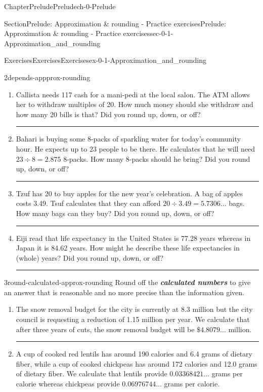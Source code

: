 \documentclass[twoside,11pt,]{book}
\newcommand{\alert}[1]{\textbf{\textit{#1}}}
\newlength{\workspacestrutwidth}
\numberwithin{equation}{section}
\begin{document}
\begin{chapterptx}{Chapter}{Prelude}{}{Prelude}{}{}{ch-0-Prelude}
\begin{sectionptx}{Section}{Prelude: Approximation \& rounding - Practice exercises}{}{Prelude: Approximation \& rounding - Practice exercises}{}{}{sec-0-1-Approximation_and_rounding}
\begin{exercises-subsection-numberless}{Exercises}{Exercises}{}{Exercises}{}{}{ex-0-1-Approximation_and_rounding}
\begin{divisionexercise}{2}{}{}{depends-appprox-rounding}
\begin{enumerate}[label=(\alph*),ref=\alph*]%
\item{}Callista needs \textdollar{}117 cash for a mani-pedi at the local salon. The ATM allows her to withdraw multiples of \textdollar{}20. How much money should she withdraw and how many \textdollar{}20 bills is that? Did you round up, down, or off?%
\par\rule{\workspacestrutwidth}{1.25in}%
\item{}Bahari is buying some 8-packs of sparkling water for today's community hour. He expects up to 23 people to be there. He calculates that he will need \(23 \div 8 = 2.875\) 8-packs. How many 8-packs should he bring? Did you round up, down, or off?%
\par\rule{\workspacestrutwidth}{1.25in}%
\item{}Tzuf has \textdollar{}20 to buy apples for the new year's celebration. A bag of apples costs \textdollar{}3.49. Tsuf calculates that they can afford \(20 \div 3.49 = 5.7306\ldots\) bags. How many bags can they buy? Did you round up, down, or off?%
\par\rule{\workspacestrutwidth}{1.25in}%
\item{}Eiji read that life expectancy in the United States is 77.28 years whereas in Japan it is 84.62 years. How might he describe these life expectancies in (whole) years? Did you round up, down, or off?%
\par\rule{\workspacestrutwidth}{1.25in}%
\end{enumerate}%
\end{divisionexercise}%
\clearpage
\begin{divisionexercise}{3}{}{}{round-calculated-approx-rounding}%
Round off the \alert{calculated numbers} to give an answer that is reasonable and no more precise than the information given.%
\begin{enumerate}[label=(\alph*),ref=\alph*]%
\item{}The snow removal budget for the city is currently at \textdollar{}8.3 million but the city council is requesting a reduction of \textdollar{}1.15 million per year. We calculate that after three years of cuts, the snow removal budget will be \(\mathbf{\$4.8079\ldots}\)  million.%
\par\rule{\workspacestrutwidth}{1.5in}%
\item{}A cup of cooked red lentils has around 190 calories and 6.4 grams of dietary fiber, while a cup of cooked chickpeas has around 172 calories and 12.0 grams of dietary fiber. We calculate that lentils provide \(\mathbf{0.03368421\ldots}\) grams per calorie whereas chickpeas provide \(\mathbf{0.06976744\ldots}\) grams per calorie.%

\end{enumerate}
\end{divisionexercise}
\end{exercises-subsection-numberless}
\end{sectionptx}
\end{chapterptx}
\end{document}

